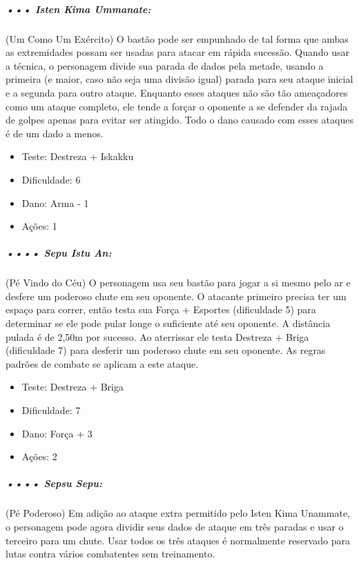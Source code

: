 \subparagraph{\bf ••• Isten Kima Ummanate:}
(Um Como Um Exército) O bastão pode ser empunhado de tal forma que ambas as extremidades possam ser usadas para atacar em rápida sucessão. Quando usar a técnica, o personagem divide sua parada de dados pela metade, usando a primeira (e maior, caso não seja uma divisão igual) parada para seu ataque inicial e a segunda para outro ataque. Enquanto esses ataques não são tão ameaçadores como um ataque completo, ele tende a forçar o oponente a se defender da rajada de golpes apenas para evitar ser atingido. Todo o dano causado com esses ataques é de um dado a menos.
\begin{itemize}[noitemsep]
\item Teste: Destreza + Iskakku
\item Dificuldade: 6
\item Dano: Arma - 1
\item Ações: 1
\end{itemize}

\subparagraph{\bf •••• Sepu Istu An:}
(Pé Vindo do Céu) O personagem usa seu bastão para jogar a si mesmo pelo ar e desfere um poderoso chute em seu oponente. O atacante primeiro precisa ter um espaço para correr, então testa sua Força + Esportes (dificuldade 5) para determinar se ele pode pular longe o suficiente até seu oponente. A distância pulada é de 2,50m por sucesso. Ao aterrissar ele testa Destreza + Briga (dificuldade 7) para desferir um poderoso chute em seu oponente. As regras padrões de combate se aplicam a este ataque.
\begin{itemize}[noitemsep]
\item Teste: Destreza + Briga
\item Dificuldade: 7
\item Dano: Força + 3
\item Ações: 2
\end{itemize}

\subparagraph{\bf •••• Sepsu Sepu:}
(Pé Poderoso) Em adição ao ataque extra permitido pelo Isten Kima Unammate, o personagem pode agora dividir seus dados de ataque em três paradas e usar o terceiro para um chute. Usar todos os três ataques é normalmente reservado para lutas contra vários combatentes sem treinamento. 

